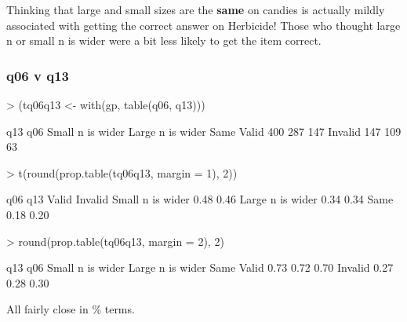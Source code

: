 \documentclass[11pt]{article}
\begin{document}
Thinking that large and small sizes are the \textbf{same} on candies is actually mildly associated with getting the correct answer on Herbicide!  Those who thought large n or small n is wider were a bit less likely to get the item correct.
\subsubsection{q06 v q13}
\label{sec-1-2-2}
\begin{Schunk}
\begin{Sinput}
> (tq06q13 <- with(gp, table(q06, q13)))
\end{Sinput}
\begin{Soutput}
         q13
q06       Small n is wider Large n is wider Same
  Valid                400              287  147
  Invalid              147              109   63
\end{Soutput}
\begin{Sinput}
> t(round(prop.table(tq06q13, margin = 1), 2))
\end{Sinput}
\begin{Soutput}
                  q06
q13                Valid Invalid
  Small n is wider  0.48    0.46
  Large n is wider  0.34    0.34
  Same              0.18    0.20
\end{Soutput}
\begin{Sinput}
> round(prop.table(tq06q13, margin = 2), 2)
\end{Sinput}
\begin{Soutput}
         q13
q06       Small n is wider Large n is wider Same
  Valid               0.73             0.72 0.70
  Invalid             0.27             0.28 0.30
\end{Soutput}
\end{Schunk}

All fairly close in \% terms.
\end{document}
